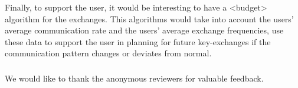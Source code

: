 Finally, to support the user, it would be interesting to have a <budget> 
algorithm for the exchanges.
This algorithms would take into account the users' average communication rate 
and the users' average exchange frequencies, use these data to support the user 
in planning for future key-exchanges if the communication pattern changes or 
deviates from normal.


\subsubsection*{\ackname}

We would like to thank the anonymous reviewers for valuable feedback.


\printbibliography{}

